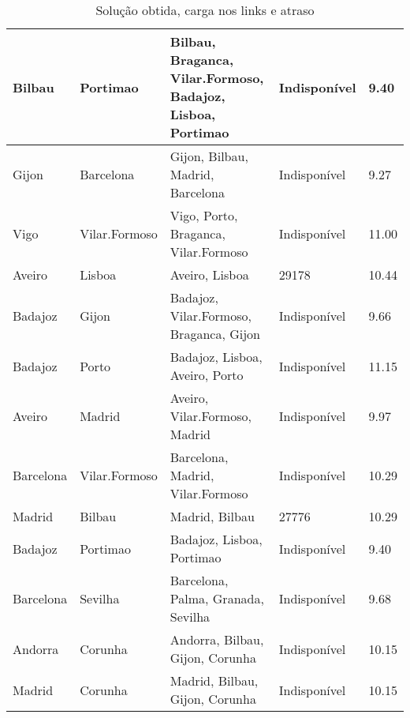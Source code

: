 \begin{table}[!htb]
{\begin{tabular}{|l|l|l|l|l|}
Bilbau & Portimao & Bilbau, Braganca, Vilar.Formoso, Badajoz, Lisboa, Portimao & Indisponível & 9.40 \\ \hline
Gijon & Barcelona & Gijon, Bilbau, Madrid, Barcelona & Indisponível & 9.27 \\ \hline
Vigo & Vilar.Formoso & Vigo, Porto, Braganca, Vilar.Formoso & Indisponível & 11.00 \\ \hline
Aveiro & Lisboa & Aveiro, Lisboa & 29178 & 10.44 \\ \hline
Badajoz & Gijon & Badajoz, Vilar.Formoso, Braganca, Gijon & Indisponível & 9.66 \\ \hline
Badajoz & Porto & Badajoz, Lisboa, Aveiro, Porto & Indisponível & 11.15 \\ \hline
Aveiro & Madrid & Aveiro, Vilar.Formoso, Madrid & Indisponível & 9.97 \\ \hline
Barcelona & Vilar.Formoso & Barcelona, Madrid, Vilar.Formoso & Indisponível & 10.29 \\ \hline
Madrid & Bilbau & Madrid, Bilbau & 27776 & 10.29 \\ \hline
Badajoz & Portimao & Badajoz, Lisboa, Portimao & Indisponível & 9.40 \\ \hline
Barcelona & Sevilha & Barcelona, Palma, Granada, Sevilha & Indisponível & 9.68 \\ \hline
Andorra & Corunha & Andorra, Bilbau, Gijon, Corunha & Indisponível & 10.15 \\ \hline
Madrid & Corunha & Madrid, Bilbau, Gijon, Corunha & Indisponível & 10.15 \\ \hline
\end{tabular}}
\caption[]{Solução obtida, carga nos links e atraso}
\end{table}

